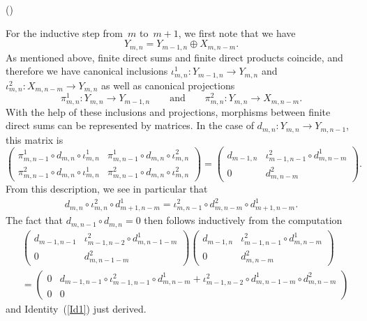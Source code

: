 \documentclass[12pt]{article}
\makeatletter
\newcounter{num}
\newenvironment{pflist}{\begin{list}{(\arabic{num})}{\usecounter{num} \leftmargin0cm \itemindent5pt}}{\end{list}}
\theoremstyle{definition}
\theoremstyle{break}
\renewenvironment{proof}[1][\proofname]{\par
\vspace{-5pt}%
\pushQED{\qed}%
\normalfont
\topsep0pt \partopsep0pt %
\trivlist
\item[\hskip\labelsep
\bfseries
#1\@addpunct{.}]\ignorespaces
}{%
\popQED\endtrivlist\@endpefalse
\addvspace{6pt plus 6pt} %
}
\renewcommand{\1}{\mathbbm{1}}
\makeatother
\begin{document}
\begin{proof}
\begin{pflist}
\item
For the inductive step from~$m$ to~$m+1$, we first note that we have
\[Y_{m,n} = Y_{m-1,n} \oplus X_{m,n-m}.\]
As mentioned above, finite direct sums and finite direct products coincide,
and therefore we have canonical inclusions
$\iota^1_{m,n} \colon Y_{m-1,n} \to Y_{m,n}$ and
$\iota^2_{m,n} \colon X_{m,n-m} \to Y_{m,n}$
as well as canonical projections
\[\pi^1_{m,n} \colon Y_{m,n} \to Y_{m-1,n} \qquad \text{and} \qquad
\pi^2_{m,n} \colon Y_{m,n} \to X_{m,n-m}.\]
With the help of these inclusions and projections, morphisms between finite direct sums can be represented by matrices. In the case of
$d_{m,n} \colon Y_{m,n} \to Y_{m,n-1}$, this matrix is
\[\begin{pmatrix}
\pi^1_{m,n-1} \circ d_{m,n} \circ \iota^1_{m,n}
& \pi^1_{m,n-1} \circ d_{m,n} \circ \iota^2_{m,n} \\
\pi^2_{m,n-1} \circ d_{m,n} \circ \iota^1_{m,n}
& \pi^2_{m,n-1} \circ d_{m,n} \circ \iota^2_{m,n}
\end{pmatrix} =
\begin{pmatrix}
d_{m-1,n} & \iota^2_{m-1,n-1} \circ d^1_{m,n-m} \\
0 & d^2_{m,n-m}
\end{pmatrix}.
\]
From this description, we see in particular that
\begin{align} \tag{I} \label{Id1}
d_{m,n} \circ \iota^2_{m,n} \circ d^1_{m+1,n-m} =
\iota^2_{m,n-1} \circ d^2_{m,n-m} \circ d^1_{m+1,n-m}.
\end{align}
The fact that $d_{m,n-1} \circ d_{m,n} = 0$ then follows inductively from the computation
\begin{align*}
&\begin{pmatrix}
d_{m-1,n-1} & \iota^2_{m-1,n-2} \circ d^1_{m,n-1-m} \\
0 & d^2_{m,n-1-m}
\end{pmatrix}
\begin{pmatrix}
d_{m-1,n} & \iota^2_{m-1,n-1} \circ d^1_{m,n-m} \\
0 & d^2_{m,n-m}
\end{pmatrix} \\
&= \begin{pmatrix}
0 & d_{m-1,n-1} \circ \iota^2_{m-1,n-1} \circ d^1_{m,n-m} + \iota^2_{m-1,n-2} \circ d^1_{m,n-1-m} \circ d^2_{m,n-m} \\
0 & 0
\end{pmatrix}
\end{align*}
and Identity~(\ref{Id1}) just derived.


\end{pflist}
\end{proof}
\end{document}
